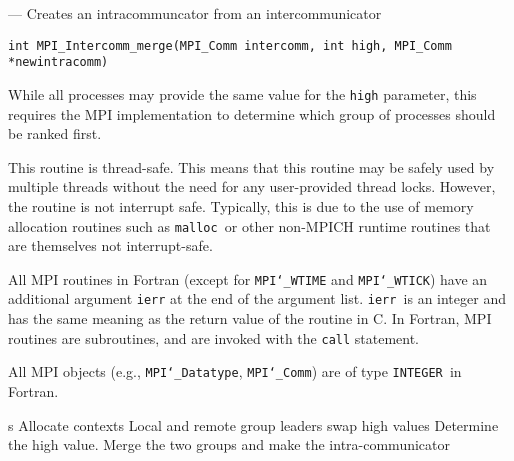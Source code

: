 \startmanpage
{}
--- Creates an intracommuncator from an intercommunicator 
\startvb\begin{verbatim}
int MPI_Intercomm_merge(MPI_Comm intercomm, int high, MPI_Comm *newintracomm)

\end{verbatim}
\endvb

\par
{}
\par
{}
While all processes may provide the same value for the {\tt high} parameter,
this requires the MPI implementation to determine which group of
processes should be ranked first.
\par
{}
\par
This routine is thread-safe.  This means that this routine may be
safely used by multiple threads without the need for any user-provided
thread locks.  However, the routine is not interrupt safe.  Typically,
this is due to the use of memory allocation routines such as {\tt malloc
}or other non-MPICH runtime routines that are themselves not interrupt-safe.
\par
{}
All MPI routines in Fortran (except for {\tt MPI{\tt \char`\_}WTIME} and {\tt MPI{\tt \char`\_}WTICK}) have
an additional argument {\tt ierr} at the end of the argument list.  {\tt ierr
}is an integer and has the same meaning as the return value of the routine
in C.  In Fortran, MPI routines are subroutines, and are invoked with the
{\tt call} statement.
\par
All MPI objects (e.g., {\tt MPI{\tt \char`\_}Datatype}, {\tt MPI{\tt \char`\_}Comm}) are of type {\tt INTEGER
}in Fortran.
\par
{}
s
Allocate contexts
Local and remote group leaders swap high values
Determine the high value.
Merge the two groups and make the intra-communicator
